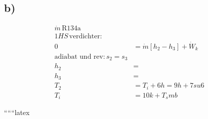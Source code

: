 

\subsection*{b)}

\begin{align*}
    \dot{m} \, \text{R134a} \\
    1HS \, \text{verdichter:} \\
    0 &= \dot{m} \left[ h_2 - h_3 \right] + \dot{W}_k \\
    \text{adiabat und rev:} \, s_2 = s_3 \\
    h_2 &= \\
    h_3 &= \\
    T_2 &= T_i + 6h = 9h + 7su6 \\
    T_i &= 10k + T_smb
\end{align*}

``````latex